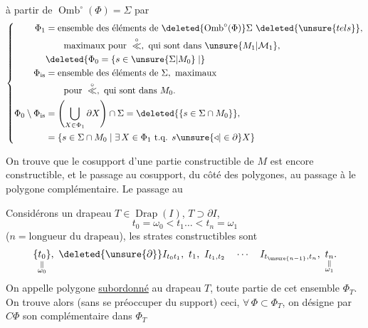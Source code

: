 
à partir de $\operatorname{Omb}^{\circ}(\Phi)=\Sigma$ par
\[
\left\{\begin{aligned}
\Phi_1&=\text{ensemble des éléments de }\deleted{\operatorname{Omb}^{\circ}(\Phi)}\Sigma\ \deleted{\unsure{tels}},\\
&\qquad\text{maximaux pour }\overset{\circ}{\ll},\text{ qui sont dans }\unsure{M_1|\mathcal M_1},\\
&\deleted{\Phi_0=\{s\in\unsure{\Sigma|M_0}\mid}\\
\Phi_{\mathrm{is}}&=\text{ensemble des éléments de }\Sigma,\text{ maximaux}\\
&\qquad\text{pour }\overset{\circ}{\ll},\text{ qui sont dans }M_0.\\
\Phi_0\setminus\Phi_{\mathrm{is}}&=\left(\bigcup_{X\in\Phi_1}\partial X\right)\cap\Sigma
 =\deleted{\{s\in\Sigma\cap M_0\}},\\
&=\{s\in\Sigma\cap M_0\mid\exists\,X\in\Phi_1\text{ t.q. }s\unsure{\triangleleft|\in\partial}X\}
\end{aligned}\right.
\]

On trouve que le cosupport d'une partie constructible de $M$ est encore constructible, et le passage au cosupport,  du côté des polygones, au passage à  le polygone complémentaire. Le passage au 

Considérons un drapeau $T\in\operatorname{Drap}(I)$, $T\supset\partial I$,
\[
t_0=\omega_0<t_1\ldots<t_n=\omega_1
\]
($n=\text{longueur du drapeau}$), les strates constructibles sont
\[
\underset{\substack{\Vert\\\omega_0}}{\{t_0\}},\ \deleted{\unsure{\partial}}I_{t_0t_1},\ t_1,\ I_{t_1,t_2}\quad\cdots\quad I_{t_{\unsure{n-1}},t_n},\ \underset{\substack{\Vert\\\omega_1}}{t_n}.
\]
On appelle polygone \uline{subordonné} au drapeau $T$, toute partie \inserted{$\Phi$} de cet ensemble $\Phi_T$. On trouve alors (sans se préoccuper du support) ceci, $\forall\,\Phi\subset\Phi_T$, on désigne par $C\Phi$ son complémentaire dans $\Phi_T$
